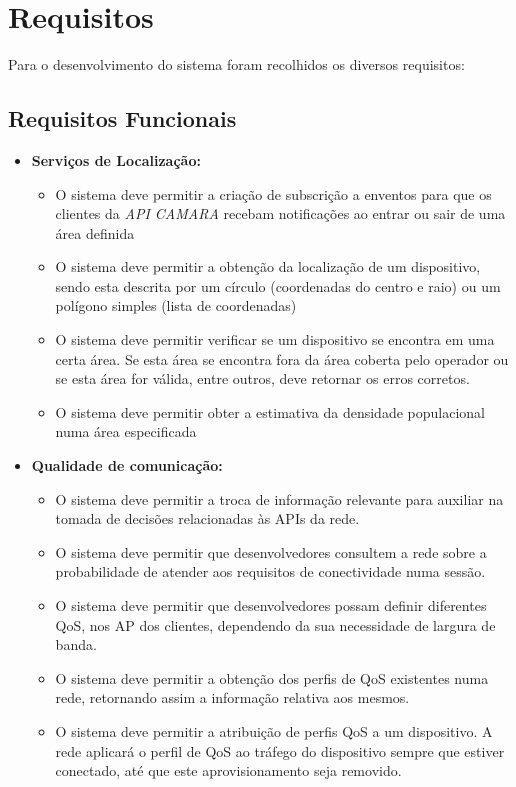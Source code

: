 \section{Requisitos}

Para o desenvolvimento do sistema foram recolhidos os diversos 
requisitos:

\subsection{Requisitos Funcionais}

\begin{itemize}
  \item \textbf{Serviços de Localização:}
    \begin{itemize}

      \item O sistema deve permitir a criação de subscrição a enventos para que os clientes da \emph{API CAMARA} recebam notificações 
        ao entrar ou sair de uma área definida
      \item O sistema deve permitir a obtenção da localização de um dispositivo, sendo esta descrita por um círculo (coordenadas do centro e raio) ou um polígono simples (lista de coordenadas)
      \item O sistema deve permitir verificar se um dispositivo se encontra em uma certa área. Se esta área se encontra fora da área coberta pelo operador ou se esta área for válida, entre outros, deve retornar os erros corretos.
      \item O sistema deve permitir obter a estimativa da densidade populacional numa área especificada
    \end{itemize}

  \item \textbf{Qualidade de comunicação:}
    \begin{itemize}

      \item O sistema deve permitir a troca de informação relevante para auxiliar na tomada de decisões relacionadas às APIs da rede.
      \item O sistema deve permitir que desenvolvedores consultem a rede sobre a probabilidade de atender aos requisitos de conectividade numa sessão. 
      \item O sistema deve permitir que desenvolvedores possam definir diferentes QoS, nos AP dos clientes, dependendo da sua necessidade de largura de banda.
      \item O sistema deve permitir a obtenção dos perfis de QoS existentes numa rede, retornando assim a informação relativa aos mesmos.
      \item O sistema deve permitir a atribuição de perfis QoS a um dispositivo. A rede aplicará o perfil de QoS ao tráfego do dispositivo sempre que estiver conectado, até que este aprovisionamento seja removido.
    \end{itemize}


\end{itemize}
